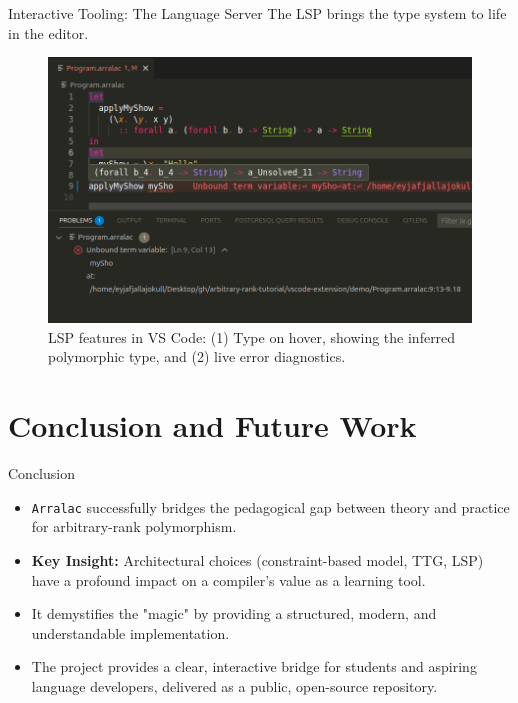 \documentclass[serif, aspectratio=169]{beamer}
\begin{document}
\begin{frame}{Interactive Tooling: The Language Server}
  The LSP brings the type system to life in the editor.
  \begin{figure}
    \includegraphics[scale=0.3]{pic/VSCode.png} %
    \caption{LSP features in VS Code: (1) Type on hover, showing the inferred polymorphic type, and (2) live error diagnostics.}
  \end{figure}
\end{frame}

\section{Conclusion and Future Work}

\begin{frame}{Conclusion}
  \begin{itemize}
    \item \texttt{Arralac} successfully bridges the pedagogical gap between theory and practice for arbitrary-rank polymorphism.
    \item \textbf{Key Insight:} Architectural choices (constraint-based model, TTG, LSP) have a profound impact on a compiler's value as a learning tool.
    \item It demystifies the "magic" by providing a structured, modern, and understandable implementation.
    \item The project provides a clear, interactive bridge for students and aspiring language developers, delivered as a public, open-source repository.
  \end{itemize}
\end{frame}
\end{document}
